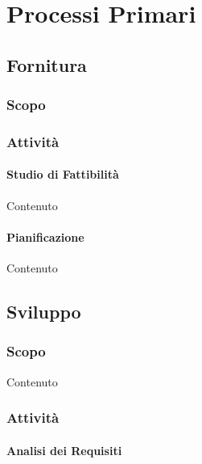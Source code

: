 \section{Processi Primari}\label{PP}

    \subsection{Fornitura}\label{PP:Fornitura}

        \subsubsection{Scopo}\label{PP:Fornitura:Scopo}

        \subsubsection{Attivit\`a}\label{PP:Fornitura:Attivita}

        \paragraph{Studio di Fattibilit\`a}\label{PP:Fornitura:SdF} Contenuto

        \paragraph{Pianificazione}\label{PP:Fornitura:Pianificazione} Contenuto

    \subsection{Sviluppo}\label{PP:Sviluppo}

        \subsubsection{Scopo}\label{PP:Sviluppo:Scopo}
        Contenuto

        \subsubsection{Attivit\`a}\label{PP:Sviluppo:Attivita}


        \paragraph{Analisi dei Requisiti}\label{PP:Sviluppo:AdR}

